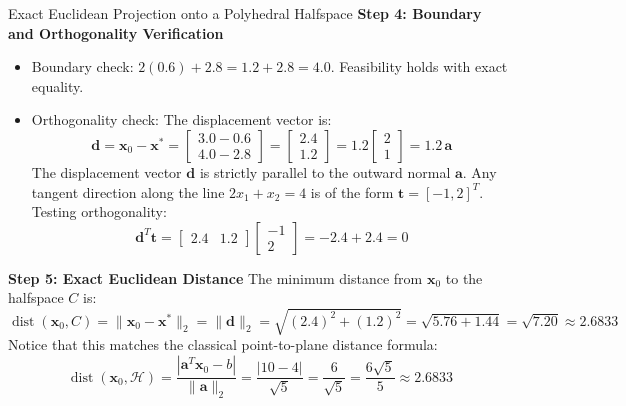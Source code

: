 \begin{examplebox}[breakable]{Exact Euclidean Projection onto a Polyhedral Halfspace}
\textbf{Step 4: Boundary and Orthogonality Verification}
\begin{itemize}
    \item Boundary check: $2(0.6) + 2.8 = 1.2 + 2.8 = 4.0$. Feasibility holds with exact equality.
    \item Orthogonality check: The displacement vector is:
    \begin{equation}
    \mathbf{d} = \mathbf{x}_0 - \mathbf{x}^* = \begin{bmatrix} 3.0 - 0.6 \\ 4.0 - 2.8 \end{bmatrix} = \begin{bmatrix} 2.4 \\ 1.2 \end{bmatrix} = 1.2 \begin{bmatrix} 2 \\ 1 \end{bmatrix} = 1.2 \, \mathbf{a}
    \end{equation}
    The displacement vector $\mathbf{d}$ is strictly parallel to the outward normal $\mathbf{a}$.
    Any tangent direction along the line $2x_1 + x_2 = 4$ is of the form $\mathbf{t} = [-1, 2]^T$. Testing orthogonality:
    \begin{equation}
    \mathbf{d}^T \mathbf{t} = \begin{bmatrix} 2.4 & 1.2 \end{bmatrix} \begin{bmatrix} -1 \\ 2 \end{bmatrix} = -2.4 + 2.4 = 0
    \end{equation}
\end{itemize}

\textbf{Step 5: Exact Euclidean Distance}
The minimum distance from $\mathbf{x}_0$ to the halfspace $C$ is:
\begin{equation}
\operatorname{dist}(\mathbf{x}_0, C) = \|\mathbf{x}_0 - \mathbf{x}^*\|_2 = \|\mathbf{d}\|_2 = \sqrt{(2.4)^2 + (1.2)^2} = \sqrt{5.76 + 1.44} = \sqrt{7.20} \approx 2.6833
\end{equation}
Notice that this matches the classical point-to-plane distance formula:
\begin{equation}
\operatorname{dist}(\mathbf{x}_0, \mathcal{H}) = \frac{|\mathbf{a}^T \mathbf{x}_0 - b|}{\|\mathbf{a}\|_2} = \frac{|10 - 4|}{\sqrt{5}} = \frac{6}{\sqrt{5}} = \frac{6\sqrt{5}}{5} \approx 2.6833
\end{equation}
\end{examplebox}

